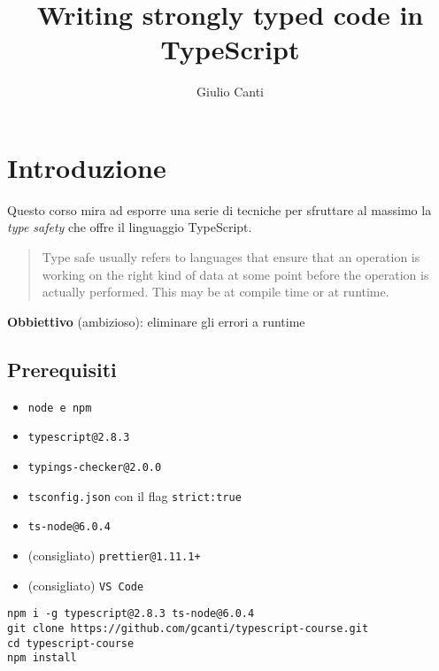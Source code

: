 \documentclass[12pt]{article}
\title{Writing strongly typed code in TypeScript}
\author{Giulio Canti}
\theoremstyle{definition}
\begin{document}
\maketitle

\tableofcontents

\newpage

\section{Introduzione}

Questo corso mira ad esporre una serie di tecniche per sfruttare al massimo la \emph{type safety} che offre il linguaggio TypeScript.

\begin{quote}
Type safe usually refers to languages that ensure that an operation is working on the right kind of data at some point
before the operation is actually performed. This may be at compile time or at runtime.
\end{quote}

\textbf{Obbiettivo} (ambizioso): eliminare gli errori a runtime


\subsection{Prerequisiti}

\begin{itemize}
  \item \texttt{node e npm}
  \item \texttt{typescript@2.8.3}
  \item \texttt{typings-checker@2.0.0}
  \item \texttt{tsconfig.json} con il flag \texttt{strict:true}
  \item \texttt{ts-node@6.0.4}
  \item (consigliato) \texttt{prettier@1.11.1+}
  \item (consigliato) \texttt{VS Code}
\end{itemize}

\begin{verbatim}
npm i -g typescript@2.8.3 ts-node@6.0.4
git clone https://github.com/gcanti/typescript-course.git
cd typescript-course
npm install
\end{verbatim}
\end{document}
